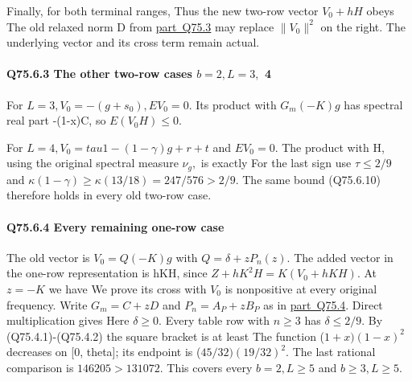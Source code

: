 Finally, for both terminal ranges,
Thus the new two-row vector \(V_0+hH\) obeys
The old relaxed norm D from \mbox{\hyperref[part:Q75.3]{part Q75.3}} may replace \(\lVert V_0\rVert ^2\) on
the right. The underlying vector and its cross term remain actual.

\paragraph{Q75.6.3 The other two-row cases \(b=2,\allowbreak  L=3,\allowbreak \) 4}

For \(L=3,\allowbreak  V_0=-(g+s_0),\allowbreak  EV_0=0.\) Its product with \(G_m(-K)g\) has
spectral real part -(1-x)C, so \(E(V_0H)\le 0.\)

For \(L=4,\allowbreak  V_0=tau1-(1-\gamma)g+r+t\) and \(EV_0=0.\) The product with
H, using the original spectral measure \(\nu_g,\allowbreak \) is exactly
For the last sign use \(\tau\le 2/9\) and
\(\kappa(1-\gamma)\ge \kappa(13/18)=247/576>2/9.\)
The same bound (Q75.6.10) therefore holds in every old two-row case.

\paragraph{Q75.6.4 Every remaining one-row case}

The old vector is \(V_0=Q(-K)g\) with \(Q=\delta+zP_n(z).\)
The added vector in the one-row representation is hKH, since
\(Z+hK^2H=K(V_0+hKH).\) At \(z=-K\) we have
We prove its cross with \(V_0\) is nonpositive at every original frequency.
Write \(G_m=C+zD\) and \(P_n=A_P+zB_P\) as in \mbox{\hyperref[part:Q75.4]{part Q75.4}}. Direct multiplication
gives
Here \(\delta\ge 0.\) Every table row with \(n\ge 3\) has \(\delta\le 2/9.\)
By (Q75.4.1)-(Q75.4.2) the square bracket is at least
The function (\(1+x)(1-x)^2\) decreases on [0, theta]; its endpoint is
(\(45/32)(19/32)^2.\) The last rational comparison is
\(146205>131072.\) This covers every \(b=2,\allowbreak  L\ge 5\) and \(b\ge 3,\allowbreak  L\ge 5.\)

